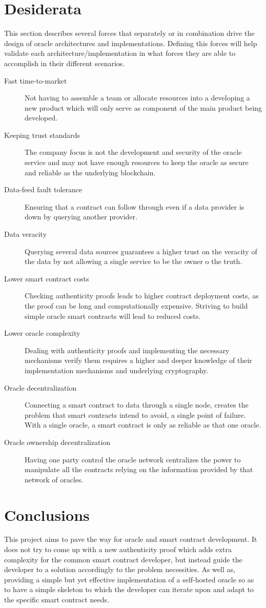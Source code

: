 \section{Desiderata}\label{Desiderata}
This section describes several forces that separately or in combination drive the design of oracle architectures and implementations. Defining this forces will help validate each architecture/implementation in what forces they are able to accomplish in their different scenarios.

\begin{description}
    \item [Fast time-to-market] Not having to assemble a team or allocate resources into a developing a new product which will only serve as component of the main product being developed.
    \item [Keeping trust standards] The company focus is not the development and security of the  oracle  service and  may  not  have  enough  resources  to  keep  the  oracle  as  secure  and reliable as the underlying blockchain.
    \item [Data-feed fault tolerance] Ensuring  that  a  contract  can  follow  through  even  if  a  data provider is down by querying another provider.
    \item [Data veracity] Querying several data sources guarantees a higher trust on the veracity of the data by not allowing a single service to be the owner o the truth.
    \item [Lower smart contract costs] Checking authenticity proofs leads to higher contract deployment costs, as the proof can be long and computationally expensive. Striving to build simple oracle smart contracts will lead to reduced costs.
    \item [Lower oracle complexity] Dealing with authenticity proofs and implementing the necessary mechanisms verify them requires a higher and deeper knowledge of their implementation mechanisms and underlying cryptography.
    \item [Oracle decentralization] Connecting a smart contract to data through a single node, creates the problem that smart contracts intend to avoid, a single point of failure.  With a single oracle, a smart contract is only as reliable as that one oracle.
    \item [Oracle ownership decentralization] Having one party control the oracle network centralizes the power to manipulate all the contracts relying on the information provided by that network of oracles.
\end{description}


\section{Conclusions}
This project aims to pave the way for oracle and smart contract development. It does not try to come up with a new authenticity proof which adds extra complexity for the common smart contract developer, but instead guide the developer to a solution accordingly to the problem necessities. As well as, providing a simple but yet effective implementation of a self-hosted oracle so as to have a simple skeleton to which the developer can iterate upon and adapt to the specific smart contract needs.